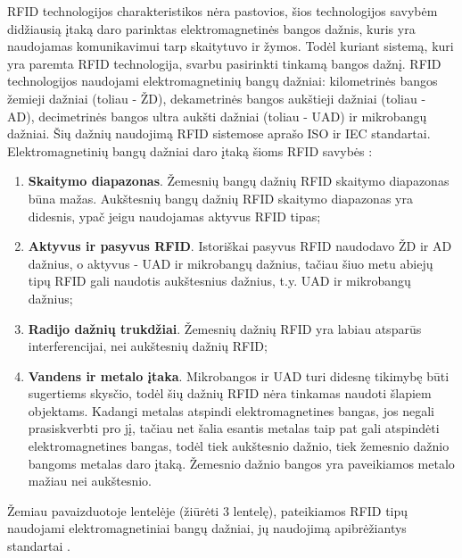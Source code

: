 RFID technologijos charakteristikos nėra pastovios, šios technologijos savybėm didžiausią įtaką daro parinktas elektromagnetinės bangos dažnis, kuris yra naudojamas komunikavimui tarp skaitytuvo ir žymos. Todėl kuriant sistemą, kuri yra paremta RFID technologija, svarbu pasirinkti tinkamą bangos dažnį. RFID technologijos naudojami elektromagnetinių bangų dažniai: kilometrinės bangos žemieji dažniai (toliau - ŽD), dekametrinės bangos aukštieji dažniai  (toliau - AD), decimetrinės bangos ultra aukšti dažniai (toliau - UAD) ir mikrobangų dažniai. Šių dažnių naudojimą RFID sistemose aprašo ISO ir IEC standartai. Elektromagnetinių bangų dažniai daro įtaką šioms RFID savybės \cite{Hunt2006}:
\begin{enumerate}
    \item \textbf{Skaitymo diapazonas}. Žemesnių bangų dažnių RFID skaitymo diapazonas būna mažas. Aukštesnių bangų dažnių RFID skaitymo diapazonas yra didesnis, ypač jeigu naudojamas aktyvus RFID tipas;
    \item \textbf{Aktyvus ir pasyvus RFID}. Istoriškai pasyvus RFID naudodavo ŽD ir AD dažnius, o aktyvus - UAD ir mikrobangų dažnius, tačiau šiuo metu abiejų tipų RFID gali naudotis aukštesnius dažnius, t.y. UAD ir mikrobangų dažnius;
    \item \textbf{Radijo dažnių trukdžiai}. Žemesnių dažnių RFID yra labiau atsparūs interferencijai, nei aukštesnių dažnių RFID;
    \item \textbf{Vandens ir metalo įtaka}. Mikrobangos ir UAD turi didesnę tikimybę būti sugertiems skysčio, todėl šių dažnių RFID nėra tinkamas naudoti šlapiem objektams. Kadangi metalas atspindi elektromagnetines bangas, jos negali prasiskverbti pro jį, tačiau net šalia esantis metalas taip pat gali atspindėti elektromagnetines bangas, todėl tiek aukštesnio dažnio, tiek žemesnio dažnio bangoms metalas daro įtaką. Žemesnio dažnio bangos yra paveikiamos metalo mažiau nei aukštesnio.
\end{enumerate}
Žemiau pavaizduotoje lentelėje (žiūrėti 3 lentelę), pateikiamos RFID tipų naudojami elektromagnetiniai bangų dažniai, jų naudojimą apibrėžiantys standartai \cite{Caglar2016}.

